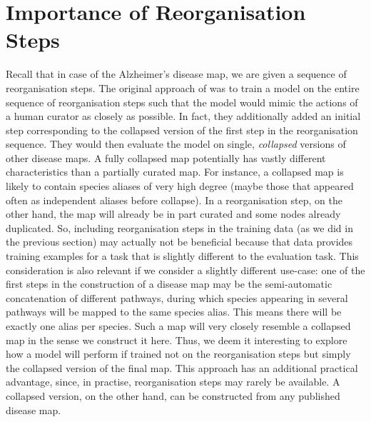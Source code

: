 \documentclass[
	fontsize=10pt, %
	twoside=false, %
	secnumdepth=1, %
  toc=indentunnumbered %
]{kaobook}
\begin{document}
\section{Importance of Reorganisation Steps}
\label{sec:importance-reorganisation-steps}
Recall that in case of the Alzheimer's disease map, we are
given a sequence of reorganisation steps. The original approach of \nielsen{}
was to
train a model on the entire sequence of reorganisation steps such that the model
would mimic the actions of a human curator as closely as possible. In fact, they
additionally added an initial step corresponding to the collapsed version of the
first step in the reorganisation sequence. They would
then evaluate the model on single, \textit{collapsed} versions of other disease maps.
%
A fully collapsed map potentially has vastly different characteristics than a
partially curated map. For instance, a collapsed map is likely to contain
species aliases of very high degree (maybe those that appeared often as
independent aliases before collapse). In a reorganisation step, on the other
hand, the map will already be in part curated and some nodes already duplicated.
%
So, including reorganisation steps in the training data (as we did in the
previous section) may actually not be beneficial because that data provides
training examples for a task that is slightly different to the evaluation task.
%
This consideration is also relevant if we consider a slightly different
use-case: one of the first steps in the construction of a disease map may be the
semi-automatic concatenation of different pathways, during which species
appearing in several pathways will be mapped to the same species alias. This
means there will be exactly one alias per species. Such a map will very closely
resemble a collapsed map in the sense we construct it here.
%
%
Thus, we deem it interesting to explore how a model will perform if trained not
on the reorganisation steps but simply the collapsed version of the final map.
%
This approach has an additional practical advantage, since, in practise,
reorganisation steps may rarely be available. A collapsed version, on the
other hand, can be constructed from any published disease map.
\end{document}
